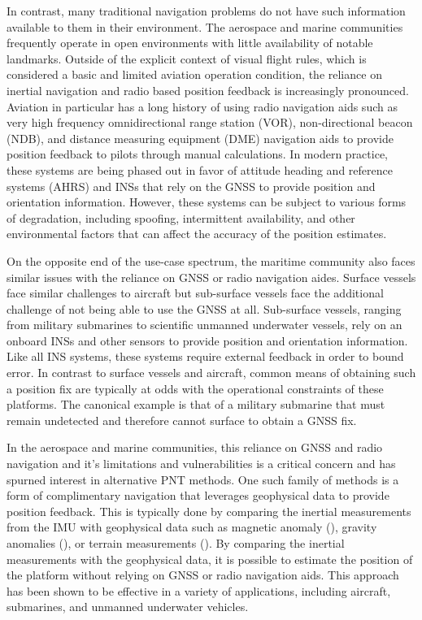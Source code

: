 \documentclass[sageh,times]{sagej}
\begin{document}
In contrast, many traditional navigation problems do not have such information available to them in their environment. The aerospace and marine communities frequently operate in open environments with little availability of notable landmarks. Outside of the explicit context of visual flight rules, which is considered a basic and limited aviation operation condition, the reliance on inertial navigation and radio based position feedback is increasingly pronounced. Aviation in particular has a long history of using radio navigation aids such as very high frequency omnidirectional range station (VOR), non-directional beacon (NDB), and distance measuring equipment (DME) navigation aids to provide position feedback to pilots through manual calculations. In modern practice, these systems are being phased out in favor of attitude heading and reference systems (AHRS) and INSs that rely on the GNSS to provide position and orientation information. However, these systems can be subject to various forms of degradation, including spoofing, intermittent availability, and other environmental factors that can affect the accuracy of the position estimates.

On the opposite end of the use-case spectrum, the maritime community also faces similar issues with the reliance on GNSS or radio navigation aides. Surface vessels face similar challenges to aircraft but sub-surface vessels face the additional challenge of not being able to use the GNSS at all. Sub-surface vessels, ranging from military submarines to scientific unmanned underwater vessels, rely on an onboard INSs and other sensors to provide position and orientation information. Like all INS systems, these systems require external feedback in order to bound error. In contrast to surface vessels and aircraft, common means of obtaining such a position fix are typically at odds with the operational constraints of these platforms. The canonical example is that of a military submarine that must remain undetected and therefore cannot surface to obtain a GNSS fix. 

In the aerospace and marine communities, this reliance on GNSS and radio navigation and it's limitations and vulnerabilities is a critical concern and has spurned interest in alternative PNT methods. One such family of methods is a form of complimentary navigation that leverages geophysical data to provide position feedback. This is typically done by comparing the inertial measurements from the IMU with geophysical data such as magnetic anomaly (\cite{magnav, tyren1982magnetic, canciani2016absolute,canciani2017airborne}), gravity anomalies (\cite{gravnav,jircitano1991gravity,kamgar1999vehicle,wang2016particle}), or terrain measurements (\cite{}). By comparing the inertial measurements with the geophysical data, it is possible to estimate the position of the platform without relying on GNSS or radio navigation aids. This approach has been shown to be effective in a variety of applications, including aircraft, submarines, and unmanned underwater vehicles.
\end{document}
